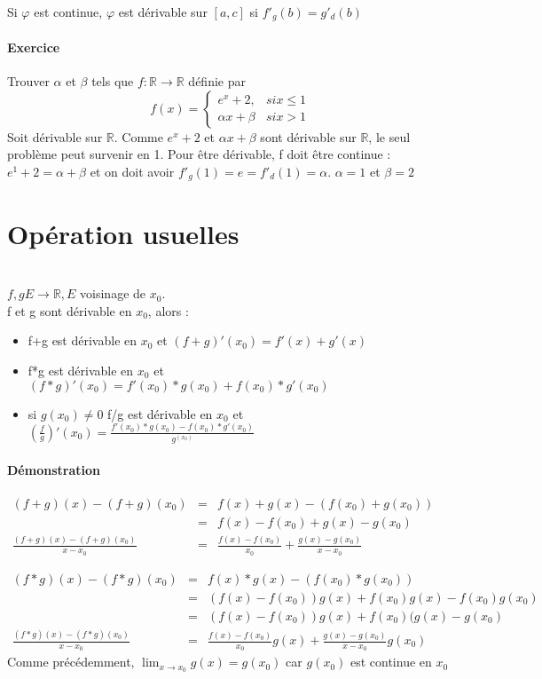 		Si $\varphi$ est continue, $\varphi$ est dérivable sur $[a, c]$ si $f'_g(b) = g'_d(b)$

		\paragraph{Exercice} Trouver $\alpha$ et $\beta$ tels que $f:\mathbb{R} \rightarrow \mathbb{R}$ définie par 
		\[f(x) = 
			\left\{
				\begin{array}{rl}
					e^x +2, & si x \leq 1 \\
					\alpha x + \beta & si x > 1
				\end{array}
				\right.
			\]
			Soit dérivable sur $\mathbb{R}$. Comme $e^x +2$ et $\alpha x + \beta$ sont dérivable sur $\mathbb{R}$, le seul problème peut survenir en 1.
			Pour être dérivable, f doit être continue :
			$e^1 + 2 = \alpha + \beta$ et on doit avoir $f'_g(1) = e = f'_d(1) = \alpha$. $\alpha = 1$ et $\beta = 2$

			\section{Opération usuelles} ~\\
			$f, g E \rightarrow \mathbb{R}, E$ voisinage de $x_0$.
			~\\
			f et g sont dérivable en $x_0$, alors :
			\begin{itemize}
				\item f+g est dérivable en $x_0$ et $(f+g)'(x_0) = f'(x)+g'(x)$
				\item f*g est dérivable en $x_0$ et $(f*g)'(x_0) = f'(x_0)*g(x_0)+f(x_0)*g'(x_0)$
				\item si $g(x_0) \neq 0$ f/g est dérivable en $x_0$ et $(\frac{f}{g})'(x_0) = \frac{f'(x_0)*g(x_0)-f(x_0)*g'(x_0)}{g^(x_0)}$
			\end{itemize}

			\paragraph{Démonstration} $\begin{array}{rcl}
				(f+g)(x) - (f+g)(x_0) &=& f(x)+g(x) - (f(x_0)+g(x_0)) \\
																							   &=& f(x) - f(x_0) + g(x) - g(x_0) \\
				\frac{(f+g)(x)-(f+g)(x_0)}{x-x_0} &=& \frac{f(x) - f(x_0)}{x_0} + \frac{g(x) - g(x_0)}{x-x_0}
			\end{array}$

			$\begin{array}{rcl}
				(f*g)(x) - (f*g)(x_0) &=& f(x)*g(x) - (f(x_0)*g(x_0)) \\
																							   &=& (f(x)-f(x_0))g(x) + f(x_0)g(x) - f(x_0)g(x_0) \\
																							   &=& (f(x)-f(x_0))g(x) + f(x_0)(g(x) -g(x_0) \\
				\frac{(f*g)(x)-(f*g)(x_0)}{x-x_0} &=& \frac{f(x) - f(x_0)}{x_0}g(x) + \frac{g(x) - g(x_0)}{x-x_0}g(x_0)
			\end{array}$
			Comme précédemment, $\lim_{x \to x_0}{g(x)} = g(x_0)$ car $g(x_0)$ est continue en $x_0$

